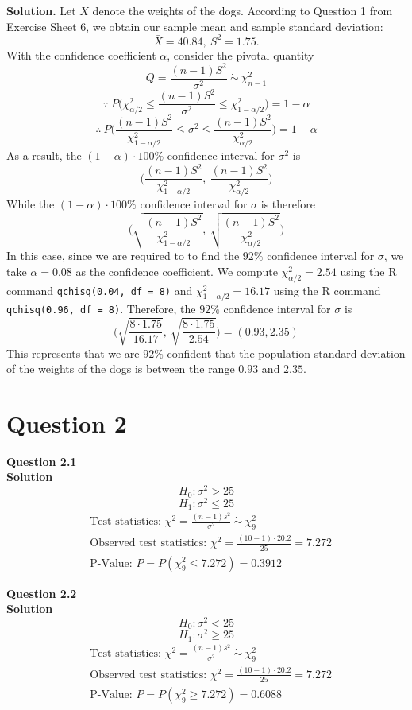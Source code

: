 \documentclass[
]{book}
\begin{document}
\textbf{Solution.} Let \(X\) denote the weights of the dogs. According to Question 1 from Exercise Sheet 6, we obtain our sample mean and sample standard deviation:
\[\bar{X} = 40.84, \ S^2 = 1.75.\]
With the confidence coefficient \(\alpha\), consider the pivotal quantity \[Q = \frac{(n-1)S^2}{\sigma^2} \ \dot\sim \ \chi_{n-1}^2\]
\[\because \ P \bigg(\chi_{\alpha/2}^2 \leq \frac{(n-1)S^2}{\sigma^2} \leq \chi_{1-\alpha/2}^2 \bigg) = 1 - \alpha\]
\[\therefore \ P \bigg(\frac{(n-1)S^2}{\chi_{1-\alpha/2}^2} \leq \sigma^2 \leq \frac{(n-1)S^2}{\chi_{\alpha/2}^2} \bigg) = 1 - \alpha\]
As a result, the \((1 - \alpha) \cdot 100\%\) confidence interval for \(\sigma^2\) is
\[\bigg(\frac{(n-1)S^2}{\chi_{1-\alpha/2}^2}, \ \frac{(n-1)S^2}{\chi_{\alpha/2}^2} \bigg)\]
While the \((1 - \alpha) \cdot 100\%\) confidence interval for \(\sigma\) is therefore
\[\bigg(\sqrt{\frac{(n-1)S^2}{\chi_{1-\alpha/2}^2}}, \ \sqrt{\frac{(n-1)S^2}{\chi_{\alpha/2}^2}} \bigg)\]
In this case, since we are required to to find the \(92\%\) confidence interval for \(\sigma\), we take \(\alpha = 0.08\) as the confidence coefficient. We compute \(\chi_{\alpha/2}^2 = 2.54\) using the R command \texttt{qchisq(0.04,\ df\ =\ 8)} and \(\chi_{1-\alpha/2}^2 = 16.17\) using the R command \texttt{qchisq(0.96,\ df\ =\ 8)}. Therefore, the \(92\%\) confidence interval for \(\sigma\) is
\[\bigg(\sqrt{\frac{8 \cdot 1.75}{16.17}}, \ \sqrt{\frac{8 \cdot 1.75}{2.54}}\bigg) = (0.93, 2.35)\]
This represents that we are \(92\%\) confident that the population standard deviation of the weights of the dogs is between the range \(0.93\) and \(2.35\).

\section{Question 2}\label{question-2-6}

\textbf{Question 2.1}\\
\textbf{Solution} \[H_0: \sigma^2 > 25\] \[H_1: \sigma^2 \leq 25\]
\[\begin{aligned}
    & \text{Test statistics: } \chi^2 = \frac{(n-1)s^2}{\sigma^2} \ \dot\sim \ \chi_{9}^2 \\
    & \text{Observed test statistics: } \chi^2 = \frac{(10-1) \cdot 20.2}{25} = 7.272 \\[0.5em]
    & \text{P-Value: } P = P(\chi_9^2 \leq 7.272) = 0.3912 \end{aligned}\]

\textbf{Question 2.2}\\
\textbf{Solution} \[H_0: \sigma^2 < 25\] \[H_1: \sigma^2 \geq 25\]
\[\begin{aligned}
    & \text{Test statistics: } \chi^2 = \frac{(n-1)s^2}{\sigma^2} \ \dot\sim \ \chi_{9}^2 \\
    & \text{Observed test statistics: } \chi^2 = \frac{(10-1) \cdot 20.2}{25} = 7.272 \\[0.5em]
    & \text{P-Value: } P = P(\chi_9^2 \geq 7.272) = 0.6088 \end{aligned}\]
\end{document}
